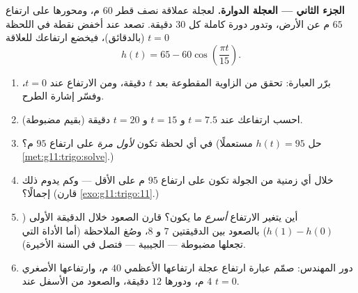 \begin{problem}
\medskip
\noindent\textbf{الجزء الثاني --- العجلة الدوارة.}
لعجلة عملاقة نصف قطر $60$ م، ومحورها على ارتفاع $65$ م عن
الأرض، وتدور دورة كاملة كل $30$ دقيقة. تصعد عند
أخفض نقطة في اللحظة $t = 0$ (بالدقائق)، فيخضع ارتفاعك للعلاقة
\[
h(t) = 65 - 60 \cos\!\left(\frac{\pi t}{15}\right).
\]
\begin{enumerate}[resume]
  \item برّر العبارة: تحقق من الزاوية المقطوعة بعد $t$
        دقيقة، ومن الارتفاع عند $t = 0$، وفسّر إشارة الطرح.
  \item احسب ارتفاعك عند $t = 7.5$ و $t = 15$ و
        $t = 20$ دقيقة (بقيم مضبوطة).
  \item في أي لحظة تكون \emph{لأول مرة} على ارتفاع $95$ م؟ (حل
        $h(t) = 95$ مستعملًا \cref{met:g11:trigo:solve}.)
  \item خلال أي  زمنية من الجولة تكون على ارتفاع $95$ م
        على الأقل --- وكم يدوم ذلك إجمالًا؟ (قارن
        \cref{exo:g11:trigo:11}.)
  \item أين يتغير الارتفاع \emph{أسرع} ما يكون؟ قارن
        الصعود خلال الدقيقة الأولى
        ($h(1) - h(0)$) بالصعود بين الدقيقتين $7$ و
        $8$، وصُغ الملاحظة (أما الأداة التي تجعلها
        مضبوطة ---  الجيبية --- فتصل
        في السنة الأخيرة).
  \item دور المهندس: صمّم عبارة ارتفاع عجلة
        ارتفاعها الأعظمي $40$ م، وارتفاعها الأصغري $4$ م، ودورها
        $12$ دقيقة، والصعود من الأسفل عند
        $t = 0$.
\end{enumerate}


\end{problem}
